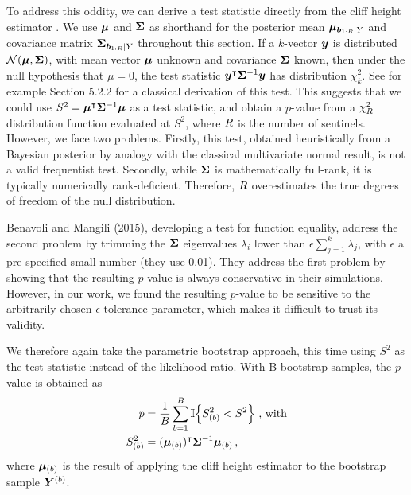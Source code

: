 	To address this oddity, we can derive a test statistic directly from the cliff height estimator .
We use \(\bm{\mu}\) and \(\bm{\Sigma}\) as shorthand for the posterior mean \(\bm{\mu}_{\bm{b}_{1:R} \mid Y}\)
and covariance matrix \(\bm{\Sigma}_{\bm{b}_{1:R} \mid Y}\) throughout this section.
If a \(k\)-vector \(\bm{y}\) is distributed \(\normal\del{\muvec, \SigmaMat}\), with mean vector \(\bm{\mu}\) unknown and covariance \(\bm{\Sigma}\) known, then under the null hypothesis that \(\mu=0\), the test statistic \(\bm{y}^{\intercal} \bm{\Sigma}^{-1} \bm{y}\) has distribution \(\chi^2_k\).
See for example \cite{rencher2003methods} Section 5.2.2 for a classical derivation of this test.
This suggests that we could use \(S^2=\bm{\mu}^{\intercal} \bm{\Sigma}^{-1} \bm{\mu}\) as a test statistic,
and obtain a \(p\)-value from a \(\chi^2_R\) distribution function evaluated at \(S^2\), where \(R\) is the number of sentinels.
However, we face two problems.
Firstly, this test, obtained heuristically from a Bayesian posterior by analogy with the classical multivariate normal result, is not a valid frequentist test.
Secondly, while \(\bm{\Sigma}\) is mathematically full-rank, it is typically numerically rank-deficient.
Therefore, \(R\) overestimates the true degrees of freedom of the null distribution.

	Benavoli and Mangili (2015), developing a test for function equality, address the second problem by trimming the \(\bm{\Sigma}\) eigenvalues \(\lambda_i\) lower than \(\epsilon \sum_{j=1}^k \lambda_j\), with \(\epsilon\) a pre-specified small number (they use 0.01).
They address the first problem by showing that the resulting \(p\)-value is always conservative in their simulations.
However, in our work, we found the resulting \(p\)-value to be sensitive to the arbitrarily chosen \(\epsilon\) tolerance parameter, which makes it difficult to trust its validity.

	We therefore again take the parametric bootstrap approach, this time using \(S^2\) as the test statistic instead of the likelihood ratio.
With B bootstrap samples, the \(p\)-value is obtained as
\begin{equation}
    \begin{split}
        p &= \frac{1}{B} \sum_{b=1}^B \Ind\cbr{S_{(b)}^2 < S^2}\  \text{, with}\\
        S_{(b)}^2 &= (\muvec_{(b)} )\trans \SigmaMat^{-1} \muvec_{(b)}\,,
    \end{split}
\end{equation}
where \(\bm{\mu}_{(b)}\) is the result of applying the cliff height estimator  to the bootstrap sample \(\bm{Y}^{(b)}\).

